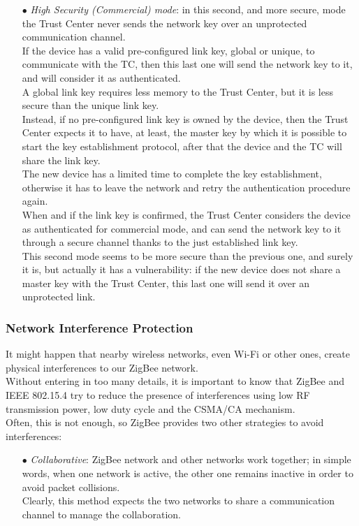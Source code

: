\documentclass[12pt]{report}
\begin{document}
{\begin{itemize}
\item[$\bullet$] \emph{High Security (Commercial) mode}: in this second, and more secure, mode the Trust Center never sends the network key over an unprotected communication channel.\\
If the device has a valid pre-configured link key, global or unique, to communicate with the TC, then this last one will send the network key to it, and will consider it as authenticated.\\
A global link key requires less memory to the Trust Center, but it is less secure than the unique link key.\\
Instead, if no pre-configured link key is owned by the device, then the Trust Center expects it to have, at least, the master key by which it is possible to start the key establishment protocol, after that the device and the TC will share the link key.\\
The new device has a limited time to complete the key establishment, otherwise it has to leave the network and retry the authentication procedure again.\\
When and if the link key is confirmed, the Trust Center considers the device as authenticated for commercial mode, and can send the network key to it through a secure channel thanks to the just established link key.\\

This second mode seems to be more secure than the previous one, and surely it is, but actually it has a vulnerability: if the new device does not share a master key with the Trust Center, this last one will send it over an unprotected link. 

\end{itemize}

\subsubsection{Network Interference Protection}
\bigskip
It might happen that nearby wireless networks, even Wi-Fi or other ones, create physical interferences to our ZigBee network.\\
Without entering in too many details, it is important to know that ZigBee and IEEE 802.15.4 try to reduce the presence of interferences using low RF transmission power, low duty cycle and the CSMA/CA mechanism.\\
Often, this is not enough, so ZigBee provides two other strategies to avoid interferences:

\begin{itemize}
\setlength{\itemindent}{+4mm}
\item[$\bullet$] \emph{Collaborative}: ZigBee network and other networks work together; in simple words, when one network is active, the other one remains inactive in order to avoid packet collisions.\\
Clearly, this method expects the two networks to share a communication channel to manage the collaboration.


\end{itemize}}
\end{document}
